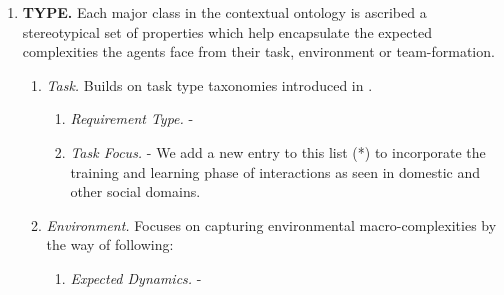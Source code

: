 \documentclass[letterpaper, 10 pt, conference]{ieeeconf}  %
\theoremstyle{definition}
\begin{document}
\begin{enumerate}

\item \textbf{TYPE.}
    Each major class in the contextual ontology is ascribed a stereotypical set of properties which help encapsulate the expected complexities the agents face from their task, environment or team-formation.
\begin{enumerate}
    \item \textit{Task.}
    Builds on task type taxonomies introduced in \cite{Phillips2015, Beer2017}.
        \begin{enumerate}
            \item \textit{Requirement Type.} \cite{Phillips2015} -
            \item \textit{Task Focus.} \cite{Beer2014toward} -
            We add a new entry to this list (*) to incorporate the training and learning phase of interactions as seen in domestic and other social domains.
        \end{enumerate}
    \item \textit{Environment.}
    Focuses on capturing environmental macro-complexities by the way of following:
        \begin{enumerate}
            \item \textit{Expected Dynamics.} \cite{Dautenhahn, Burke2004} -

\end{enumerate}
\end{enumerate}
\end{enumerate}
\end{document}
